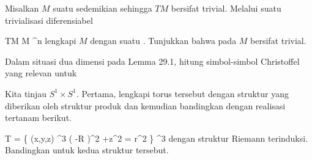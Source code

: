 \setcounter{section}{29}


{}
{

Misalkan $M$ suatu
sedemikian sehingga
$TM$ bersifat trivial. Melalui suatu trivialisasi diferensiabel

\mavergleichskette
{\vergleichskette
{ TM
}
{ \cong }{ M \times \R^n
}
{  }{
}
{    }{
}
{   }{
}
}
{}{}{}
lengkapi $M$
 {} {}
dengan suatu
 {} {.}
Tunjukkan bahwa
pada $M$ bersifat trivial.

}
{} {}

{}
{

Dalam situasi dua dimensi pada
Lemma 29.1,
hitung simbol-simbol Christoffel yang relevan untuk

}
{} {}

{}
{

Kita tinjau
$S^1 \times S^1$. Pertama, lengkapi torus tersebut dengan struktur yang diberikan oleh struktur produk
 {} {}
dan
kemudian bandingkan dengan realisasi tertanam berikut.

\mavergleichskettedisp
{\vergleichskette
{ T
}
{ =} { \left\{ (x,y,z) \in \R^3  \mid   \left(   -R  \right)^2 +z^2  = r^2         \right\}
}
{ \subseteq} { \R^3
}
{ } {
}
{ } {
}
}
{}{}{}
dengan struktur Riemann terinduksi. Bandingkan
untuk kedua struktur tersebut.

}
{} {}


